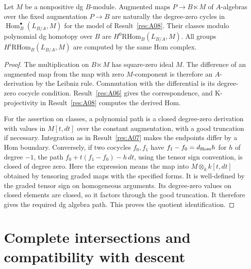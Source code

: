 \begin{proposition}\label{res:A10}
Let \(M\) be a nonpositive dg \(B\)-module. Augmented maps
\(P\to B\ltimes M\) of \(A\)-algebras over the fixed augmentation
\(P\to B\) are naturally the degree-zero cycles in
\(\operatorname{Hom}_B^\bullet(L_{B/A},M)\) for the model of
Result~\ref{res:A08}. Their classes modulo polynomial dg homotopy
over \(B\) are \(H^0\mathrm{RHom}_B(L_{B/A},M)\).
All groups \(H^i\mathrm{RHom}_B(L_{B/A},M)\) are computed by the
same Hom complex.
\end{proposition}
\begin{proof}
The multiplication on \(B\ltimes M\) has square-zero ideal \(M\).
The difference of an augmented map from the map with zero
\(M\)-component is therefore an \(A\)-derivation by the Leibniz rule.
Commutation with the differential is its degree-zero cocycle
condition. Result~\ref{res:A06} gives the correspondence, and
K-projectivity in Result~\ref{res:A08} computes the derived Hom.

For the assertion on classes, a polynomial path is a closed
degree-zero derivation with values in \(M[t,dt]\) over the
constant augmentation, with a good truncation if necessary.
Integration as in Result~\ref{res:A07} makes the endpoints differ
by a Hom boundary. Conversely, if two cocycles \(f_0,f_1\) have
\(f_1-f_0=d_{\rm Hom}h\) for \(h\) of degree \(-1\), the path
\(f_0+t(f_1-f_0)-h\,dt\), using the tensor sign convention, is
closed of degree zero. Here the expression means the map into
\(M\otimes_k k[t,dt]\) obtained by tensoring graded maps with the
specified forms. It is well-defined by the graded tensor sign
on homogeneous arguments. Its degree-zero values on closed
elements are closed, so it factors through the good truncation.
It therefore gives the required dg algebra path. This proves
the quotient identification.
\end{proof}

\section{Complete intersections and compatibility with descent}

